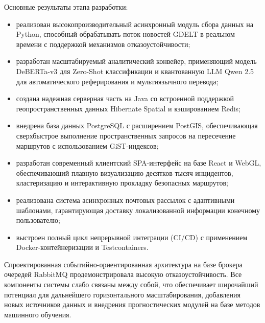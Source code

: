 Основные результаты этапа разработки:
\begin{itemize}
    \item реализован высокопроизводительный асинхронный модуль сбора данных на Python, способный обрабатывать поток новостей GDELT в реальном времени с поддержкой механизмов отказоустойчивости;
    \item разработан масштабируемый аналитический конвейер, применяющий модель DeBERTa-v3 для Zero-Shot классификации и квантованную LLM Qwen 2.5 для автоматического реферирования и мультиязычного перевода;
    \item создана надежная серверная часть на Java со встроенной поддержкой геопространственных данных Hibernate Spatial и кэшированием Redis;
    \item внедрена база данных PostgreSQL с расширением PostGIS, обеспечивающая сверхбыстрое выполнение пространственных запросов на пересечение маршрутов с использованием GiST-индексов;
    \item разработан современный клиентский SPA-интерфейс на базе React и WebGL, обеспечивающий плавную визуализацию десятков тысяч инцидентов, кластеризацию и интерактивную прокладку безопасных маршрутов;
    \item реализована система асинхронных почтовых рассылок с адаптивными шаблонами, гарантирующая доставку локализованной информации конечному пользователю;
    \item выстроен полный цикл непрерывной интеграции (CI/CD) с применением Docker-контейнеризации и Testcontainers.
\end{itemize}

Спроектированная событийно-ориентированная архитектура на базе брокера очередей RabbitMQ продемонстрировала высокую отказоустойчивость. Все компоненты системы слабо связаны между собой, что обеспечивает широчайший потенциал для дальнейшего горизонтального масштабирования, добавления новых источников данных и внедрения прогностических модулей на базе методов машинного обучения.